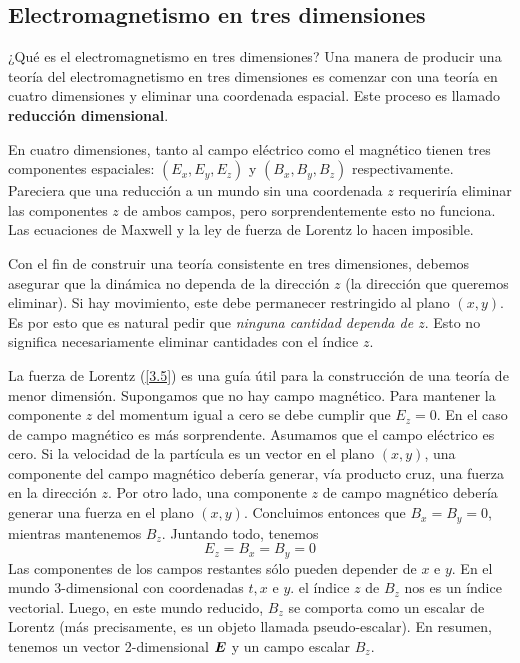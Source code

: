 \subsection{Electromagnetismo en tres dimensiones}
¿Qué es el electromagnetismo en tres dimensiones? Una manera de producir una teoría del electromagnetismo en tres dimensiones es comenzar con una teoría en cuatro dimensiones y eliminar una coordenada espacial. Este proceso es llamado \textbf{reducción dimensional}.

En cuatro dimensiones, tanto al campo eléctrico como el magnético tienen tres componentes espaciales: $(E_x,E_y,E_z)$ y $(B_x,B_y,B_z)$ respectivamente. Pareciera que una reducción a un mundo sin una coordenada $z$ requeriría eliminar las componentes $z$ de ambos campos, pero sorprendentemente esto no funciona. Las ecuaciones de Maxwell y la ley de fuerza de Lorentz lo hacen imposible.

Con el fin de construir una teoría consistente en tres dimensiones, debemos asegurar que la dinámica no dependa de la dirección $z$ (la dirección que queremos eliminar). Si hay movimiento, este debe permanecer restringido al plano $(x,y)$. Es por esto que es natural pedir que \textit{ninguna cantidad dependa de $z$}. Esto no significa necesariamente eliminar cantidades con el índice $z$.

La fuerza de Lorentz (\ref{3.5}) es una guía útil para la construcción de una teoría de menor dimensión. Supongamos que no hay campo magnético. Para mantener la componente $z$ del momentum igual a cero se debe cumplir que $E_z=0$. En el caso de campo magnético es más sorprendente. Asumamos que el campo eléctrico es cero. Si la velocidad de la partícula es un vector en el plano $(x,y)$, una componente del campo magnético debería generar, vía producto cruz, una fuerza en la dirección $z$. Por otro lado, una componente $z$ de campo magnético debería generar una fuerza en el plano $(x,y)$. Concluimos entonces que $B_x=B_y=0$, mientras mantenemos $B_z$. Juntando todo, tenemos
\begin{equation}
    E_z=B_x=B_y=0
\end{equation}
Las componentes de los campos restantes sólo pueden depender de $x$ e $y$. En el mundo 3-dimensional con coordenadas $t,x$ e $y$. el índice $z$ de $B_z$ nos es un índice vectorial. Luego, en este mundo reducido, $B_z$ se comporta como un escalar de Lorentz (más precisamente, es un objeto llamada pseudo-escalar). En resumen, tenemos un vector 2-dimensional $\vb*{E}$ y un campo escalar $B_z$.

